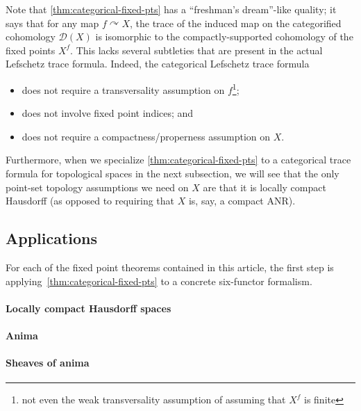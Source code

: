 \begin{rmk}
  Note that \cref{thm:categorical-fixed-pts} has a ``freshman's dream''-like quality; it says that for any map $f\curvearrowright X$, the trace of the induced map on the categorified cohomology $\mathcal D(X)$ is isomorphic to the compactly-supported cohomology of the fixed points $X^f$. This lacks several subtleties that are present in the actual Lefschetz trace formula. Indeed, the categorical Lefschetz trace formula
  \begin{itemize}
  \item does not require a transversality assumption on $f$\footnote{not even the weak transversality assumption of assuming that $X^f$ is finite};
  \item does not involve fixed point indices; and
  \item does not require a compactness/properness assumption on $X$.
  \end{itemize}
  Furthermore, when we specialize \cref{thm:categorical-fixed-pts} to a categorical trace formula for topological spaces in the next subsection, we will see that the only point-set topology assumptions we need on $X$ are that it is locally compact Hausdorff (as opposed to requiring that $X$ is, say, a compact ANR).
\end{rmk}
\subsection{Applications}
For each of the fixed point theorems contained in this article, the first step is applying~\cref{thm:categorical-fixed-pts} to a concrete six-functor formalism.
\paragraph{Locally compact Hausdorff spaces}
\paragraph{Anima}
\paragraph{Sheaves of anima}
